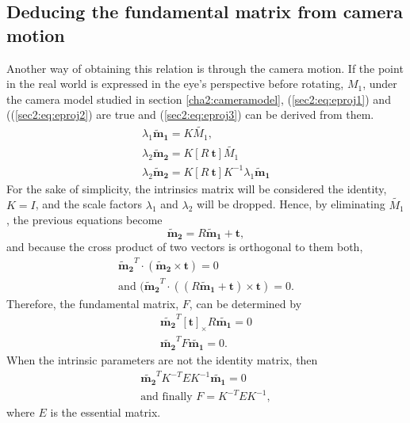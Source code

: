 \subsection{Deducing the fundamental matrix from camera motion}
Another way of obtaining this relation is through the camera motion.
If the point in the real world is expressed in the eye's perspective before rotating, $M_1$, under the camera model studied in section \ref{cha2:cameramodel}, (\ref{sec2:eq:eproj1}) and ((\ref{sec2:eq:eproj2}) are true and (\ref{sec2:eq:eproj3}) can be derived from them.
\begin{align}
\label{sec2:eq:eproj1}
\lambda_1 \mathbf{\tilde{m}_1} = K \tilde{M_1}, \\
\label{sec2:eq:eproj2}
\lambda_2 \mathbf{\tilde{m}_2} = K [ R \ \mathbf{t} ] \tilde{M_1}\\
\label{sec2:eq:eproj3}
\lambda_2 \mathbf{\tilde{m}_2} = K [ R \ \mathbf{t} ] K^{-1} \lambda_1 \mathbf{\tilde{m}_1}
\end{align}
For the sake of simplicity, the intrinsics matrix will be considered the identity, $K= I$, and the scale factors $\lambda_1$ and $\lambda_2$ will be dropped. Hence, by eliminating $\tilde{M_1}$, the previous equations become
\begin{equation}
\label{sec2:eq:elimp}
\mathbf{\tilde{m}_2} = R   \mathbf{\tilde{m}_1} + \mathbf{t},
\end{equation}
and because the cross product of two vectors is orthogonal to them both,  
\begin{align}
	\label{sec2:eq:fundm1}
	\mathbf{\tilde{m}_2}^T \cdot ( \mathbf{\tilde{m}_2} \times \mathbf{t}) = 0 \\
	\label{sec2:eq:fundm2}
	\text{and } ( \mathbf{\tilde{m}_2}^T\cdot((R  \mathbf{\tilde{m}_1} + \mathbf{t}) \times \mathbf{t}) = 0.
\end{align}
Therefore, the fundamental matrix, $F$, can be determined by 
\begin{equation}
\label{sec2:eq:fundm3}
\begin{aligned}
\mathbf{\tilde{m_2}}^T [\mathbf{t}]_\times R \mathbf{\tilde{m_1}} = 0 \\
\mathbf{\tilde{m_2}}^T F \mathbf{\tilde{m_1}} = 0.
\end{aligned}
\end{equation}
When the intrinsic parameters are not the identity matrix, then 
\begin{equation}
\begin{aligned}
\label{hhh}
\mathbf{\tilde{m_2}}^T K^{-T} E K^{-1} \mathbf{\tilde{m_1}} = 0 \\
\text{and finally }
F = K^{-T}  E K^{-1},
\end{aligned}
\end{equation}
where $E$ is the essential matrix.

